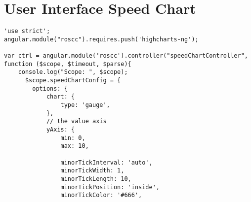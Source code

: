 \section{User Interface Speed Chart}
\begin{verbatim}
'use strict';
angular.module("roscc").requires.push('highcharts-ng');

var ctrl = angular.module('roscc').controller("speedChartController", function ($scope, $timeout, $parse){
    console.log("Scope: ", $scope);
      $scope.speedChartConfig = {
        options: {
            chart: {
                type: 'gauge',
            },
            // the value axis
            yAxis: {
                min: 0,
                max: 10,
                
                minorTickInterval: 'auto',
                minorTickWidth: 1,
                minorTickLength: 10,
                minorTickPosition: 'inside',
                minorTickColor: '#666',
        

\end{verbatim}
